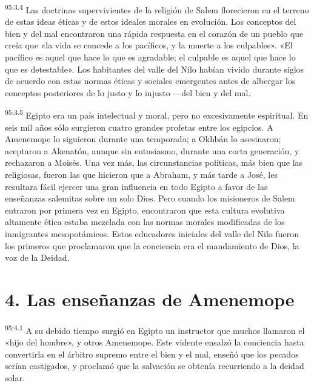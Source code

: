\par
\textsuperscript{95:3.4} Las doctrinas supervivientes de la religión de Salem florecieron en el terreno de estas ideas éticas y de estos ideales morales en evolución. Los conceptos del bien y del mal encontraron una rápida respuesta en el corazón de un pueblo que creía que «la vida se concede a los pacíficos, y la muerte a los culpables». «El pacífico es aquel que hace lo que es agradable; el culpable es aquel que hace lo que es detestable». Los habitantes del valle del Nilo habían vivido durante siglos de acuerdo con estas normas éticas y sociales emergentes antes de albergar los conceptos posteriores de lo justo y lo injusto ---del bien y del mal.

\par
\textsuperscript{95:3.5} Egipto era un país intelectual y moral, pero no excesivamente espiritual. En seis mil años sólo surgieron cuatro grandes profetas entre los egipcios. A Amenemope lo siguieron durante una temporada; a Okhbán lo asesinaron; aceptaron a Akenatón, aunque sin entusiasmo, durante una corta generación, y rechazaron a Moisés. Una vez más, las circunstancias políticas, más bien que las religiosas, fueron las que hicieron que a Abraham, y más tarde a José, les resultara fácil ejercer una gran influencia en todo Egipto a favor de las enseñanzas salemitas sobre un solo Dios. Pero cuando los misioneros de Salem entraron por primera vez en Egipto, encontraron que esta cultura evolutiva altamente ética estaba mezclada con las normas morales modificadas de los inmigrantes mesopotámicos. Estos educadores iniciales del valle del Nilo fueron los primeros que proclamaron que la conciencia era el mandamiento de Dios, la voz de la Deidad.

\section*{4. Las enseñanzas de Amenemope}
\par
\textsuperscript{95:4.1} A su debido tiempo surgió en Egipto un instructor que muchos llamaron el «hijo del hombre», y otros Amenemope. Este vidente ensalzó la conciencia hasta convertirla en el árbitro supremo entre el bien y el mal, enseñó que los pecados serían castigados, y proclamó que la salvación se obtenía recurriendo a la deidad solar.

